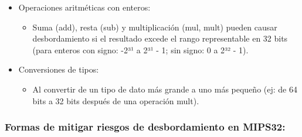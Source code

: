 \documentclass{article}
\begin{document}
\begin{itemize}[leftmargin=*]
    \item Operaciones aritméticas con enteros:
    \begin{itemize}
        \item Suma (add), resta (sub) y multiplicación (mul, mult) pueden causar desbordamiento si el resultado excede el rango representable en 32 bits (para enteros con signo: -2³¹ a 2³¹ - 1; sin signo: 0 a 2³² - 1).
    \end{itemize}
    
    \item Conversiones de tipos:
    \begin{itemize}
        \item Al convertir de un tipo de dato más grande a uno más pequeño (ej: de 64 bits a 32 bits después de una operación mult).
    \end{itemize}
\end{itemize}

\subsubsection*{Formas de mitigar riesgos de desbordamiento en MIPS32:}
\end{document}
